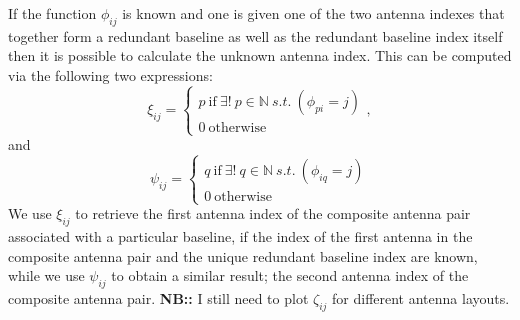 \documentclass[useAMS,usenatbib]{mn2e}
\begin{document}
If the function $\phi_{ij}$ is known and one is given one of the two antenna indexes that together form a redundant baseline as well as the redundant baseline index itself then it is possible 
to calculate the unknown antenna index. This can be computed via the following two expressions:
\begin{equation}
\xi_{ij} = 
\begin{cases}
p~\textrm{if}~\exists! ~ p \in \mathbb{N} ~ s.t. ~(\phi_{pi} = j)\\
0~\textrm{otherwise}
\end{cases},
\end{equation}
and
\begin{equation}
\psi_{ij} = 
\begin{cases}
q~\textrm{if}~\exists! ~ q \in \mathbb{N} ~ s.t. ~(\phi_{iq} = j)\\
0~\textrm{otherwise}
\end{cases}
\end{equation}
We use $\xi_{ij}$ to retrieve the first antenna index of the composite antenna pair associated with a particular baseline, if the index of the first antenna in the composite antenna pair and the unique redundant baseline index are known, while we use $\psi_{ij}$ to obtain 
a similar result; the second antenna index of the composite antenna pair. \textbf{NB::} I still need to plot $\zeta_{ij}$ for different antenna layouts.
\end{document}
